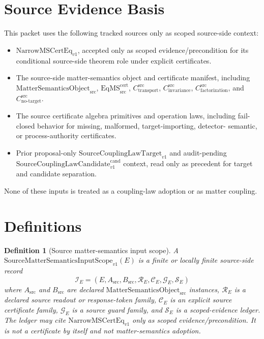 \documentclass[11pt]{article}
\newcommand{\MSObj}{\mathrm{MatterSemanticsObject}_{\mathrm{src}}}
\newcommand{\EqMScert}{\mathrm{EqMS}^{\mathrm{cert}}_{\mathrm{src}}}
\newcommand{\NarrowMSCertEq}{\mathrm{NarrowMSCertEq}_{v1}}
\newcommand{\CTr}{C_{\mathrm{transport}}^{\mathrm{src}}}
\newcommand{\CInv}{C_{\mathrm{invariance}}^{\mathrm{src}}}
\newcommand{\CFact}{C_{\mathrm{factorization}}^{\mathrm{src}}}
\newcommand{\CNTI}{C_{\mathrm{no\text{-}target}}^{\mathrm{src}}}
\newcommand{\SourceCoupTargetOld}{\mathrm{SourceCouplingLawTarget}_{v1}}
\newcommand{\SourceCoupCandOld}{\mathrm{SourceCouplingLawCandidate}^{\mathrm{cand}}_{v1}}
\newcommand{\SMScope}{\mathrm{SourceMatterSemanticsInputScope}_{v1}}
\newtheorem{definition}{Definition}
\begin{document}
\section{Source Evidence Basis}

This packet uses the following tracked sources only as scoped source-side
context:

\begin{itemize}[leftmargin=2em]
\item \(\NarrowMSCertEq\), accepted only as scoped evidence/precondition for
its conditional source-side theorem role under explicit certificates.
\item The source-side matter-semantics object and certificate manifest,
including \(\MSObj\), \(\EqMScert\), \(\CTr\), \(\CInv\), \(\CFact\), and
\(\CNTI\).
\item The source certificate algebra primitives and operation laws, including
fail-closed behavior for missing, malformed, target-importing, detector-
semantic, or process-authority certificates.
\item Prior proposal-only \(\SourceCoupTargetOld\) and audit-pending
\(\SourceCoupCandOld\) context, read only as precedent for target and
candidate separation.
\end{itemize}

None of these inputs is treated as a coupling-law adoption or as matter
coupling.

\section{Definitions}

\begin{definition}[Source matter-semantics input scope]
A \(\SMScope(E)\) is a finite or locally finite source-side record
\[
  \mathcal I_E =
  (E,A_{\mathrm{src}},B_{\mathrm{src}},\mathcal R_E,
  \mathcal C_E,\mathcal G_E,\mathcal S_E)
\]
where \(A_{\mathrm{src}}\) and \(B_{\mathrm{src}}\) are declared
\(\MSObj\) instances, \(\mathcal R_E\) is a declared source readout or
response-token family, \(\mathcal C_E\) is an explicit source certificate
family, \(\mathcal G_E\) is a source guard family, and \(\mathcal S_E\) is a
scoped-evidence ledger. The ledger may cite \(\NarrowMSCertEq\) only as
scoped evidence/precondition. It is not a certificate by itself and not
matter-semantics adoption.
\end{definition}
\end{document}
